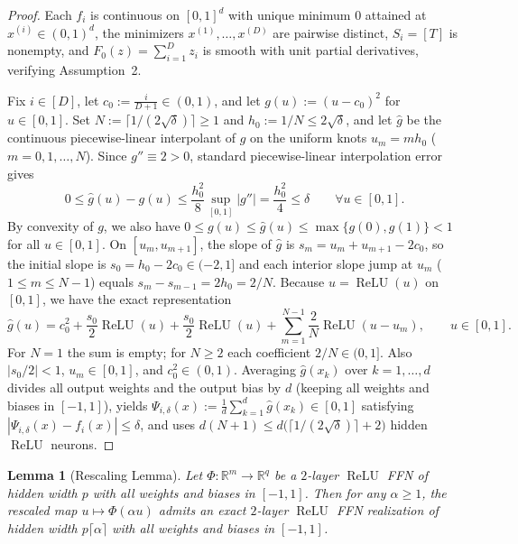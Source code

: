 \documentclass[11pt]{article}
\theoremstyle{plain}
\newtheorem{lemma}{Lemma}
\theoremstyle{definition}
\theoremstyle{remark}
\DeclareMathOperator{\ReLU}{ReLU}
\newcommand{\R}{\mathbb{R}}
\newcommand{\1}{\mathbf{1}}
\begin{document}
\begin{proof}
Each $f_i$ is continuous on $[0,1]^d$ with unique minimum $0$ attained at $x^{(i)} \in (0,1)^d$, the minimizers $x^{(1)}, \dots, x^{(D)}$ are pairwise distinct, $S_i = [T]$ is nonempty, and $F_0(z) = \sum_{i=1}^D z_i$ is smooth with unit partial derivatives, verifying Assumption~2.

Fix $i \in [D]$, let $c_0 := \frac{i}{D+1} \in (0,1)$, and let $g(u) := (u - c_0)^2$ for $u \in [0,1]$. Set $N := \lceil 1/(2\sqrt{\delta})\rceil \ge 1$ and $h_0 := 1/N \le 2\sqrt{\delta}$, and let $\hat{g}$ be the continuous piecewise-linear interpolant of $g$ on the uniform knots $u_m = m h_0$ ($m = 0, 1, \dots, N$). Since $g'' \equiv 2 > 0$, standard piecewise-linear interpolation error gives
\[
0 \le \hat{g}(u) - g(u) \le \frac{h_0^2}{8} \sup_{[0,1]} |g''| = \frac{h_0^2}{4} \le \delta \qquad \forall u \in [0,1].
\]
By convexity of $g$, we also have $0 \le g(u) \le \hat{g}(u) \le \max\{g(0), g(1)\} < 1$ for all $u \in [0,1]$. On $[u_m, u_{m+1}]$, the slope of $\hat{g}$ is $s_m = u_m + u_{m+1} - 2c_0$, so the initial slope is $s_0 = h_0 - 2c_0 \in (-2, 1]$ and each interior slope jump at $u_m$ ($1 \le m \le N-1$) equals $s_m - s_{m-1} = 2h_0 = 2/N$. Because $u = \ReLU(u)$ on $[0,1]$, we have the exact representation
\[
\hat{g}(u) = c_0^2 + \frac{s_0}{2}\ReLU(u) + \frac{s_0}{2}\ReLU(u) + \sum_{m=1}^{N-1} \frac{2}{N}\ReLU(u - u_m), \qquad u \in [0,1].
\]
For $N = 1$ the sum is empty; for $N \ge 2$ each coefficient $2/N \in (0,1]$. Also $|s_0/2| < 1$, $u_m \in [0,1]$, and $c_0^2 \in (0,1)$. Averaging $\hat{g}(x_k)$ over $k = 1, \dots, d$ divides all output weights and the output bias by $d$ (keeping all weights and biases in $[-1,1]$), yields $\Psi_{i,\delta}(x) := \frac{1}{d}\sum_{k=1}^d \hat{g}(x_k) \in [0,1]$ satisfying $|\Psi_{i,\delta}(x) - f_i(x)| \le \delta$, and uses $d(N+1) \le d\bigl(\lceil 1/(2\sqrt{\delta})\rceil + 2\bigr)$ hidden $\ReLU$ neurons.
\end{proof}

\begin{lemma}[Rescaling Lemma]\label{lem:rescale}
Let $\Phi : \R^m \to \R^q$ be a $2$-layer $\ReLU$ FFN of hidden width $p$ with all weights and biases in $[-1,1]$. Then for any $\alpha \ge 1$, the rescaled map $u \mapsto \Phi(\alpha u)$ admits an exact $2$-layer $\ReLU$ FFN realization of hidden width $p\lceil \alpha \rceil$ with all weights and biases in $[-1,1]$.
\end{lemma}
\end{document}
